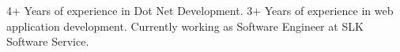 

\begin{cvparagraph}

4+ Years of experience in Dot Net Development. 3+ Years of experience in web application development. Currently working as Software Engineer at SLK Software Service. 
\end{cvparagraph}
